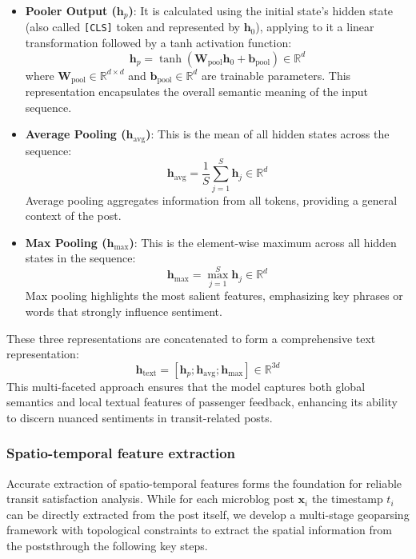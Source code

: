 \documentclass[a4paper,fleqn,12pt]{cas-sc}
\begin{document}
\begin{itemize}
    \item \textbf{Pooler Output (\(\boldsymbol{h}_p\))}: It is calculated using the initial state's hidden state (also called \texttt{[CLS]} token and represented by \(\boldsymbol{h}_0\)), applying to it a linear transformation followed by a tanh activation function:
    \begin{equation}
            \boldsymbol{h}_p = \tanh(\boldsymbol{W}_{\text{pool}} \boldsymbol{h}_0 + \boldsymbol{b}_{\text{pool}}) \in \mathbb{R}^{d}
    \end{equation}
    where \(\boldsymbol{W}_{\text{pool}} \in \mathbb{R}^{d \times d}\) and \(\boldsymbol{b}_{\text{pool}} \in \mathbb{R}^{d}\) are trainable parameters. This representation encapsulates the overall semantic meaning of the input sequence.
    \item \textbf{Average Pooling (\(\boldsymbol{h}_{\text{avg}}\))}: This is the mean of all hidden states across the sequence:
    \begin{equation}
        \boldsymbol{h}_{\text{avg}} = \frac{1}{S} \sum_{j=1}^{S} \boldsymbol{h}_j \in \mathbb{R}^{d}
    \end{equation}
    Average pooling aggregates information from all tokens, providing a general context of the post.
    \item \textbf{Max Pooling (\(\boldsymbol{h}_{\text{max}}\))}: This is the element-wise maximum across all hidden states in the sequence:
    \begin{equation}
        \boldsymbol{h}_{\text{max}} = \max_{j=1}^{S} \boldsymbol{h}_j \in \mathbb{R}^{d}
    \end{equation}
    Max pooling highlights the most salient features, emphasizing key phrases or words that strongly influence sentiment.
\end{itemize}

These three representations are concatenated to form a comprehensive text representation:
\begin{equation}
\boldsymbol{h}_{\text{text}} = [\boldsymbol{h}_p; \boldsymbol{h}_{\text{avg}}; \boldsymbol{h}_{\text{max}}] \in \mathbb{R}^{3d}
\end{equation}
This multi-faceted approach ensures that the model captures both global semantics and local textual features of passenger feedback, enhancing its ability to discern nuanced sentiments in transit-related posts.

\subsubsection{Spatio-temporal feature extraction}
Accurate extraction of spatio-temporal features forms the foundation for reliable transit satisfaction analysis. While for each microblog post $\boldsymbol{x}_i$ the timestamp $t_i$ can be directly extracted from the post itself, we develop a multi-stage geoparsing framework with topological constraints to extract the spatial information from the poststhrough the following key steps.
\end{document}
